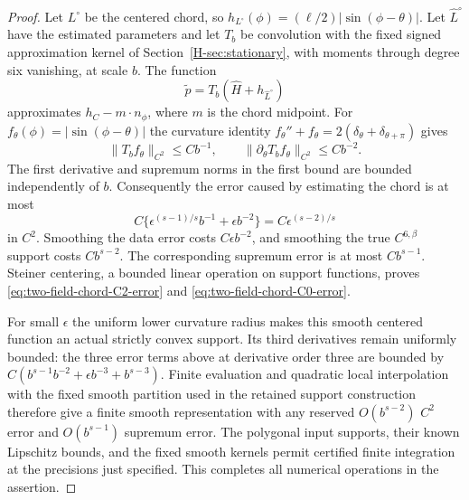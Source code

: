 \begin{proof}
Let $L^\circ$ be the centered chord, so
$h_{L^\circ}(\phi)=(\ell/2)|\sin(\phi-\theta)|$.
Let $\widehat L^\circ$ have the estimated parameters and let $T_b$
be convolution with the fixed signed approximation kernel of
Section~\ref{H-sec:stationary}, with moments through degree six
vanishing, at scale $b$.  The function
\[
              \widetilde p=T_b(\widehat H+h_{\widehat L^\circ})
\]
approximates $h_C-m\cdot n_\phi$, where $m$ is the chord midpoint.
For $f_\theta(\phi)=|\sin(\phi-\theta)|$ the curvature identity
$f_\theta''+f_\theta=2(\delta_\theta+\delta_{\theta+\pi})$
gives
\[
 \|T_b f_\theta\|_{C^2}\le Cb^{-1},\qquad
 \|\partial_\theta T_b f_\theta\|_{C^2}\le Cb^{-2}.
\]
The first derivative and supremum norms in the first bound are
bounded independently of $b$.  Consequently the error caused by
estimating the chord is at most
\[
 C\{\epsilon^{(s-1)/s}b^{-1}+\epsilon b^{-2}\}
       =C\epsilon^{(s-2)/s}
\]
in $C^2$.  Smoothing the data error costs $C\epsilon b^{-2}$,
and smoothing the true $C^{6,\beta}$ support costs $Cb^{s-2}$.
The corresponding supremum error is at most $Cb^{s-1}$.
Steiner centering, a bounded linear operation on support functions,
proves \eqref{eq:two-field-chord-C2-error} and
\eqref{eq:two-field-chord-C0-error}.

For small $\epsilon$ the uniform lower curvature radius makes this
smooth centered function an actual strictly convex support.
Its third derivatives remain uniformly bounded: the three error
terms above at derivative order three are bounded by
$C(b^{s-1}b^{-2}+\epsilon b^{-3}+b^{s-3})$.
Finite evaluation and quadratic local interpolation with the fixed
smooth partition used in the retained support construction therefore
give a finite smooth representation with any reserved $O(b^{s-2})$
$C^2$ error and $O(b^{s-1})$ supremum error.  The polygonal input
supports, their known Lipschitz bounds, and the fixed smooth kernels
permit certified finite integration at the precisions just specified.
This completes all numerical operations in the assertion.
\end{proof}

